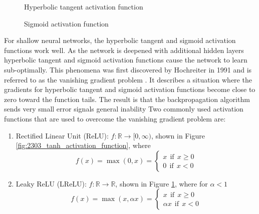 \begin{figure}[h]
	\centering
	\begin{minipage}[t]{0.45\textwidth}
		\centering
		
		\caption[Hyperbolic tangent activation function]{Hyperbolic tangent activation function}
		\label{fig:2303_tanh_activation_function}
	\end{minipage}
	\hspace{1cm}
	\begin{minipage}[t]{0.45\textwidth}
		\centering
		
		\caption[Sigmoid activation function]{Sigmoid activation function}
		\label{fig:2304_sigmoid_activation_function}
	\end{minipage}
\end{figure}

For shallow neural networks, the hyperbolic tangent and sigmoid activation functions work well. As the network is deepened with additional hidden layers hyperbolic tangent and sigmoid activation functions  cause the network to learn sub-optimally. This phenomena was first discovered by Hochreiter in 1991 and is referred to as the vanishing gradient problem \cite{Hochreiter1991}. It describes a situation where the gradients for hyperbolic tangent and sigmoid activation functions become close to zero toward the function tails. The result is that the backpropagation algorithm sends very small error signals general inability  Two commonly used activation functions that are used to overcome the vanishing gradient problem are:
\begin{enumerate}
	\item Rectified Linear Unit (ReLU): $f:\mathbb{R} \to [0,\infty)$, shown in Figure \ref{fig:2303_tanh_activation_function}, where
	\begin{equation}
		f(x) = \max(0,x) = \begin{cases}
							x \ \ \text{if} \ \ x \geq 0 \\
							0 \ \ \text{if} \ \ x < 0	
						   \end{cases}
	\end{equation}
	\item Leaky ReLU (LReLU): $f:\mathbb{R} \to \mathbb{R}$, shown in Figure \ref{fig:2304_sigmoid_activation_function}, where for $\alpha < 1$
	\begin{equation}
		f(x) = \max(x, \alpha x) =   \begin{cases}
									  x \ \ \text{if} \ \ x \geq 0 \\
									 \alpha x \ \ \text{if} \ \ x < 0	
			   						 \end{cases}
	\end{equation}
\end{enumerate}

